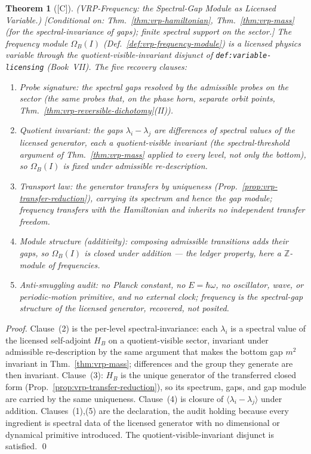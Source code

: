 \documentclass[12pt,oneside]{amsbook}
\theoremstyle{plain}
\newtheorem{theorem}{Theorem}[section]
\theoremstyle{definition}
\theoremstyle{remark}
\newcommand{\status}[1]{\textup{[#1]}}
\begin{document}
\begin{theorem}[\status{C}]\label{thm:vrp-frequency}
\textup{(VRP-Frequency: the Spectral-Gap Module as Licensed Variable.)}
\textup{[Conditional on: Thm.~\ref{thm:vrp-hamiltonian},
Thm.~\ref{thm:vrp-mass} (for the spectral-invariance of gaps); finite
spectral support on the sector.]}
The frequency module $\Omega_B(I)$ (Def.~\ref{def:vrp-frequency-module})
is a licensed physics variable through the quotient-visible-invariant
disjunct of \texttt{def:variable-licensing} (Book~VII).  The five
recovery clauses:
\begin{enumerate}[label=\textup{(\arabic*)}]
  \item \emph{Probe signature:} the spectral gaps resolved by the
    admissible probes on the sector (the same probes that, on the phase
    horn, separate orbit points,
    Thm.~\ref{thm:vrp-reversible-dichotomy}(II)).
  \item \emph{Quotient invariant:} the gaps $\lambda_i-\lambda_j$ are
    differences of spectral values of the licensed generator, each a
    quotient-visible invariant (the spectral-threshold argument of
    Thm.~\ref{thm:vrp-mass} applied to every level, not only the
    bottom), so $\Omega_B(I)$ is fixed under admissible re-description.
  \item \emph{Transport law:} the generator transfers by uniqueness
    (Prop.~\ref{prop:vrp-transfer-reduction}), carrying its spectrum
    and hence the gap module; frequency transfers with the Hamiltonian
    and inherits no independent transfer freedom.
  \item \emph{Module structure (additivity):} composing admissible
    transitions adds their gaps, so $\Omega_B(I)$ is closed under
    addition --- the ledger property, here a $\mathbb{Z}$-module of
    frequencies.
  \item \emph{Anti-smuggling audit:} no Planck constant, no
    $E=\hbar\omega$, no oscillator, wave, or periodic-motion primitive,
    and no external clock; frequency is the spectral-gap structure of
    the licensed generator, recovered, not posited.
\end{enumerate}
\end{theorem}

\begin{proof}
Clause~(2) is the per-level spectral-invariance: each $\lambda_i$ is a
spectral value of the licensed self-adjoint $H_B$ on a quotient-visible
sector, invariant under admissible re-description by the same argument
that makes the bottom gap $m^2$ invariant in Thm.~\ref{thm:vrp-mass};
differences and the group they generate are then invariant.
Clause~(3): $H_B$ is the unique generator of the transferred closed
form (Prop.~\ref{prop:vrp-transfer-reduction}), so its spectrum, gaps,
and gap module are carried by the same uniqueness.  Clause~(4) is
closure of $\langle\lambda_i-\lambda_j\rangle$ under addition.
Clauses~(1),(5) are the declaration, the audit holding because every
ingredient is spectral data of the licensed generator with no
dimensional or dynamical primitive introduced.  The
quotient-visible-invariant disjunct is satisfied. \qed
\end{proof}
\end{document}
